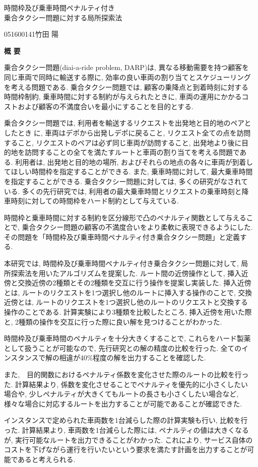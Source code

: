 \begin{center}
{\LARGE 時間枠及び乗車時間ペナルティ付き\\乗合タクシー問題に対する局所探索法}\\[0.5cm]
\end{center}
\hfill
{\large 051600141\qquad 竹田 陽}\\[0.5cm]
\begin{center}
{\Large \bf 概 要}\\
\end{center}


乗合タクシー問題(diai-a-ride problem, DARP)は, 異なる移動需要を持つ顧客を同じ車両で同時に輸送する際に, 効率の良い車両の割り当てとスケジューリングを考える問題である. 乗合タクシー問題では, 顧客の乗降点と到着時刻に対する時間枠制約, 乗車時間に対する制約が与えられたときに, 車両の運用にかかるコストおよび顧客の不満度合いを最小にすることを目的とする.

乗合タクシー問題では, 利用者を輸送するリクエストを出発地と目的地のペアとしたときに, 車両はデポから出発しデポに戻ること, リクエスト全ての点を訪問すること, リクエストのペアは必ず同じ車両が訪問すること, 出発地より後に目的地を訪問することの全てを満たすルートと車両の割り当てを考える問題である. 利用者は, 出発地と目的地の場所, およびそれらの地点の各々に車両が到着してほしい時間枠を指定することができる.
また, 乗車時間に対して, 最大乗車時間を指定することができる.
乗合タクシー問題に対しては, 多くの研究がなされている. 多くの先行研究では, 利用者の最大乗車時間とリクエストの乗車時刻と降車時刻に対しての時間枠をハード制約として与えている.

時間枠と乗車時間に対する制約を区分線形で凸のペナルティ関数として与えることで, 乗合タクシー問題の顧客の不満度合いをより柔軟に表現できるようにした. その問題を「時間枠及び乗車時間ペナルティ付き乗合タクシー問題」と定義する.

本研究では, 時間枠及び乗車時間ペナルティ付き乗合タクシー問題に対して, 局所探索法を用いたアルゴリズムを提案した.
ルート間の近傍操作として, 挿入近傍と交換近傍の2種類とその2種類を交互に行う操作を提案し実装した.
挿入近傍とは, ルートのリクエストを1つ選択し他のルートに挿入する操作のことで, 交換近傍とは, ルートのリクエストを1つ選択し他のルートのリクエストと交換する操作のことである.
計算実験により3種類を比較したところ, 挿入近傍を用いた際と, 2種類の操作を交互に行った際に良い解を見つけることがわかった.

時間枠及び乗車時間のペナルティを十分大きくすることで, これらをハード製薬として扱うことが可能なので, 先行研究との解の精度の比較を行った. 全てのインスタンスで解の相違が40\%程度の解を出力することを確認した.

また,　目的関数におけるペナルティ係数を変化させた際のルートの比較を行った. 計算結果より, 係数を変化させることでペナルティを優先的に小さくしたい場合や, 少しペナルティが大きくてもルートの長さも小さくしたい場合など, 様々な場合に対応するルートを出力することが可能であることが確認できた.

インスタンスで定められた車両数を1台減らした際の計算実験も行い, 比較を行った. 計算結果より, 車両数を1台減らした際には, ペナルティの値は大きくなるが, 実行可能なルートを出力できることがわかった. これにより, サービス自体のコストを下げながら運行を行いたいという要求を満たす計画を出力することが可能であると考えられる.
